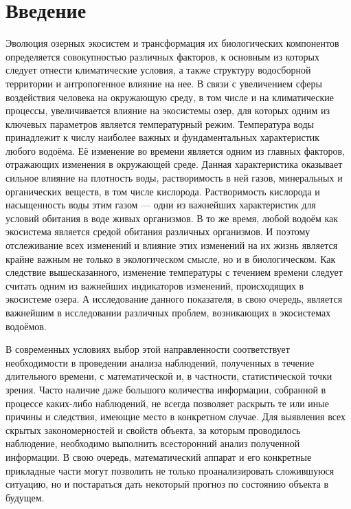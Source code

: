 
\newpage

\chapter*{Введение}

Эволюция озерных экосистем и трансформация их биологических компонентов определяется совокупностью различных факторов, к основным из которых следует отнести климатические условия, а также структуру водосборной территории и антропогенное влияние на нее. В связи с увеличением сферы воздействия человека на окружающую среду, в том числе и на климатические процессы, увеличивается влияние на экосистемы озер, для которых одним из ключевых параметров является температурный режим. Температура воды принадлежит к числу наиболее важных и фундаментальных характеристик любого водоёма. Её изменение во времени является одним из главных факторов, отражающих изменения в окружающей среде. Данная характеристика оказывает сильное влияние на плотность воды, растворимость в ней газов, минеральных и органических веществ, в том числе кислорода. Растворимость кислорода и насыщенность воды этим газом --- одни из важнейших характеристик для условий обитания в воде живых организмов. В то же время, любой водоём как экосистема является средой обитания различных организмов. И поэтому отслеживание всех изменений и влияние этих изменений на их жизнь является крайне важным не только в экологическом смысле, но и в биологическом. Как следствие вышесказанного, изменение температуры с течением времени следует считать одним из важнейших индикаторов изменений, происходящих в экосистеме озера. А исследование данного показателя, в свою очередь, является важнейшим в исследовании различных проблем, возникающих в экосистемах водоёмов.

В современных условиях выбор этой направленности соответствует необходимости в проведении анализа наблюдений, полученных в течение длительного времени, с математической и, в частности, статистической точки зрения. Часто наличие даже большого количества информации, собранной в процессе каких-либо наблюдений, не всегда позволяет раскрыть те или иные причины и следствия, имеющие место в конкретном случае. Для выявления всех скрытых закономерностей и свойств объекта, за которым проводилось наблюдение, необходимо выполнить всесторонний анализ полученной информации. В свою очередь, математический аппарат и его конкретные прикладные части могут позволить не только проанализировать сложившуюся ситуацию, но и постараться дать некоторый прогноз по состоянию объекта в будущем.

